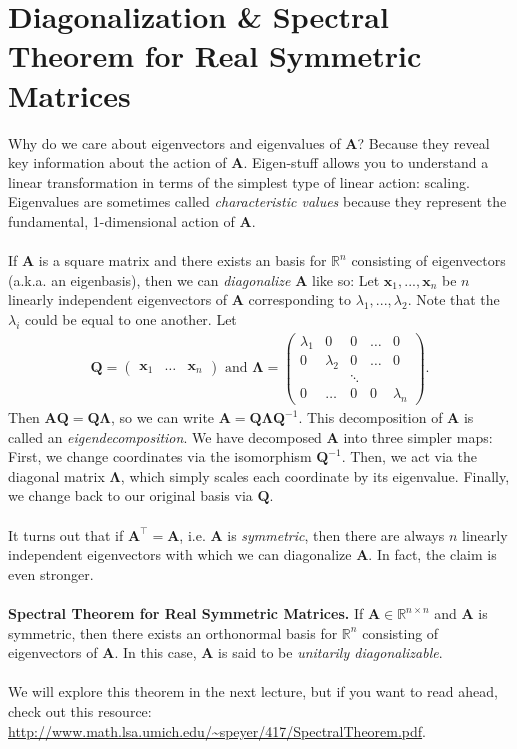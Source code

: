 \documentclass{article}
\begin{document}
\section{Diagonalization \& Spectral Theorem for Real Symmetric Matrices}
Why do we care about eigenvectors and eigenvalues of $\mathbf{A}$? Because they reveal key information about the action of $\mathbf{A}$. Eigen-stuff allows you to understand a linear transformation in terms of the simplest type of linear action: scaling. Eigenvalues are sometimes called \textit{characteristic values} because they represent the fundamental, 1-dimensional action of $\mathbf{A}$. 
\\ \\
If $\mathbf{A}$ is a square matrix and there exists an basis for $\mathbb{R}^n$ consisting of eigenvectors (a.k.a. an eigenbasis), then we can \textit{diagonalize} $\mathbf{A}$ like so: Let $\textbf{x}_1, ... , \textbf{x}_n$ be $n$ linearly independent eigenvectors of $\mathbf{A}$ corresponding to $\lambda_1, ... , \lambda_2$. Note that the $\lambda_i$ could be equal to one another. Let
\begin{align*}
\mathbf{Q} = \begin{pmatrix}
\textbf{x}_1 & \hdots & \textbf{x}_n
\end{pmatrix}
\text{ and } 
\mathbf{\Lambda} = \begin{pmatrix}
\lambda_1 & 0 & 0 & \hdots & 0 \\
0 & \lambda_2 & 0 & \hdots & 0 \\
& & \ddots \\
0 & \hdots & 0 & 0 & \lambda_n
\end{pmatrix}.
\end{align*}
Then $\mathbf{AQ = Q\Lambda}$, so we can write $\mathbf{A = Q\Lambda Q}^{-1}$. This decomposition of $\mathbf{A}$ is called an \textit{eigendecomposition}. We have decomposed $\mathbf{A}$ into three simpler maps: First, we change coordinates via the isomorphism $\mathbf{Q}^{-1}$. Then, we act via the diagonal matrix $\mathbf{\Lambda}$, which simply scales each coordinate by its eigenvalue. Finally, we change back to our original basis via $\mathbf{Q}$. 
\\ \\
It turns out that if $\mathbf{A^\top = A}$, i.e. $\mathbf{A}$ is \textit{symmetric}, then there are always $n$ linearly independent eigenvectors with which we can diagonalize $\mathbf{A}$. In fact, the claim is even stronger.
\\ \\
\textbf{Spectral Theorem for Real Symmetric Matrices.} If $\mathbf{A} \in \mathbb{R}^{n \times n}$ and $\mathbf{A}$ is symmetric, then there exists an orthonormal basis for $\mathbb{R}^n$ consisting of eigenvectors of $\mathbf{A}$. In this case, $\mathbf{A}$ is said to be \textit{unitarily diagonalizable}. 
\\ \\
We will explore this theorem in the next lecture, but if you want to read ahead, check out this resource: \url{http://www.math.lsa.umich.edu/\~speyer/417/SpectralTheorem.pdf}.
 
\end{document}
